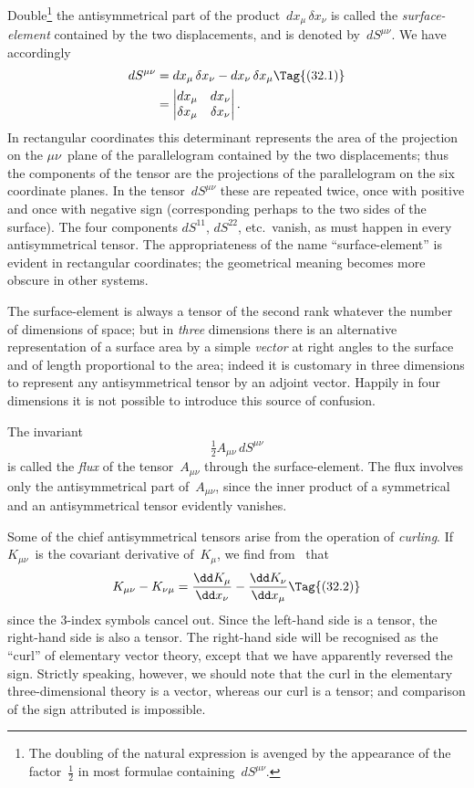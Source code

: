 \documentclass[12pt]{book}
\begin{document}
Double\footnote
  {The doubling of the natural expression is avenged by the appearance of the factor~$\frac{1}{2}$ in most
  formulae containing~$dS^{\mu\nu}$.}
the antisymmetrical part of the product~$dx_{\mu}\, \delta x_{\nu}$ is called the
\emph{surface-element} contained by the two displacements, and is denoted by~$dS^{\mu\nu}$.
%
We have accordingly
\begin{align*}
  dS^{\mu\nu} &= dx_{\mu}\, \delta x_{\nu} - dx_{\nu}\, \delta x_{\mu}
\Tag{(32.1)} \\
  &= \left\lvert\begin{array}{@{}cc@{}}
  dx_{\mu} & dx_{\nu} \\
  \delta x_{\mu} & \delta x_{\nu} \\
\end{array}\right\rvert.
\end{align*}
In rectangular coordinates this determinant represents the area of the projection
on the $\mu\nu$~plane of the parallelogram contained by the two displacements;
thus the components of the tensor are the projections of the
parallelogram on the six coordinate planes. In the tensor~$dS^{\mu\nu}$ these are
repeated twice, once with positive and once with negative sign (corresponding
perhaps to the two sides of the surface). The four components $dS^{11}$, $dS^{22}$, etc.\
vanish, as must happen in every antisymmetrical tensor. The appropriateness
\index{Antisymmetrical tensors}%
of the name ``surface-element'' is evident in rectangular coordinates; the
geometrical meaning becomes more obscure in other systems.

The surface-element is always a tensor of the second rank whatever the
number of dimensions of space; but in \emph{three} dimensions there is an alternative
representation of a surface area by a simple \emph{vector} at right angles to the
surface and of length proportional to the area; indeed it is customary in three
dimensions to represent any antisymmetrical tensor by an adjoint vector.
Happily in four dimensions it is not possible to introduce this source of
confusion.

The invariant
\[
\tfrac{1}{2} A_{\mu\nu}\, dS^{\mu\nu}
\]
is called the \emph{flux} of the tensor~$A_{\mu\nu}$ through the surface-element. The flux
\index{Flux}%
involves only the antisymmetrical part of~$A_{\mu\nu}$, since the inner product of a
symmetrical and an antisymmetrical tensor evidently vanishes.

Some of the chief antisymmetrical tensors arise from the operation of
\emph{curling}. If $K_{\mu\nu}$~is the covariant derivative of~$K_{\mu}$, we find from~ that
\[
K_{\mu\nu} - K_{\nu\mu} = \frac{\dd K_{\mu}}{\dd x_{\nu}} - \frac{\dd K_{\nu}}{\dd x_{\mu}}
\Tag{(32.2)}
\]
since the $3$-index symbols cancel out. Since the left-hand side is a tensor, the
right-hand side is also a tensor. The right-hand side will be recognised as the
``curl'' of elementary vector theory, except that we have apparently reversed
\index{Curl}%
the sign. Strictly speaking, however, we should note that the curl in the
elementary three-dimensional theory is a vector, whereas our curl is a tensor;
and comparison of the sign attributed is impossible.
\end{document}
